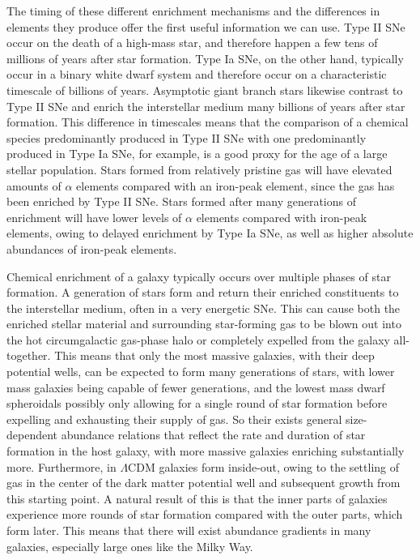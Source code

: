 The timing of these different enrichment mechanisms and the differences in elements they produce offer the first useful information we can use. Type II SNe occur on the death of a high-mass star, and therefore happen a few tens of millions of years after star formation. Type Ia SNe, on the other hand, typically occur in a binary white dwarf system and therefore occur on a characteristic timescale of billions of years. Asymptotic giant branch stars likewise contrast to Type II SNe and enrich the interstellar medium many billions of years after star formation. This difference in timescales means that the comparison of a chemical species predominantly produced in Type II SNe with one predominantly produced in Type Ia SNe, for example, is a good proxy for the age of a large stellar population. Stars formed from relatively pristine gas will have elevated amounts of $\alpha$ elements compared with an iron-peak element, since the gas has been enriched by Type II SNe. Stars formed after many generations of enrichment will have lower levels of $\alpha$ elements compared with iron-peak elements, owing to delayed enrichment by Type Ia SNe, as well as higher absolute abundances of iron-peak elements.

Chemical enrichment of a galaxy typically occurs over multiple phases of star formation. A generation of stars form and return their enriched constituents to the interstellar medium, often in a very energetic SNe. This can cause both the enriched stellar material and surrounding star-forming gas to be blown out into the hot circumgalactic gas-phase halo or completely expelled from the galaxy all-together. This means that only the most massive galaxies, with their deep potential wells, can be expected to form many generations of stars, with lower mass galaxies being capable of fewer generations, and the lowest mass dwarf spheroidals possibly only allowing for a single round of star formation before expelling and exhausting their supply of gas. So their exists general size-dependent abundance relations that reflect the rate and duration of star formation in the host galaxy, with more massive galaxies enriching substantially more. Furthermore, in $\Lambda$CDM galaxies form inside-out, owing to the settling of gas in the center of the dark matter potential well and subsequent growth from this starting point. A natural result of this is that the inner parts of galaxies experience more rounds of star formation compared with the outer parts, which form later. This means that there will exist abundance gradients in many galaxies, especially large ones like the Milky Way.

